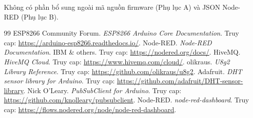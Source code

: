 \documentclass[13pt,a4paper]{article}
\begin{document}
Không có phần bổ sung ngoài mã nguồn firmware (Phụ lục A) và JSON Node-RED (Phụ lục B).

\begin{thebibliography}{99}
    \fontsize{13}{16}\selectfont
     ESP8266 Community Forum. \textit{ESP8266 Arduino Core Documentation}. Truy cap: \url{https://arduino-esp8266.readthedocs.io/}.
     Node-RED. \textit{Node-RED Documentation}. IBM \& others. Truy cap: \url{https://nodered.org/docs/}.
     HiveMQ. \textit{HiveMQ Cloud}. Truy cap: \url{https://www.hivemq.com/cloud/}.
    olikraus. \textit{U8g2 Library Reference}. Truy cap: \url{https://github.com/olikraus/u8g2}.
    Adafruit. \textit{DHT sensor library for Arduino}. Truy cap: \url{https://github.com/adafruit/DHT-sensor-library}.
    Nick O'Leary. \textit{PubSubClient for Arduino}. Truy cap: \url{https://github.com/knolleary/pubsubclient}.
    Node-RED. \textit{node-red-dashboard}. Truy cap: \url{https://flows.nodered.org/node/node-red-dashboard}.
\end{thebibliography}

\end{document}
